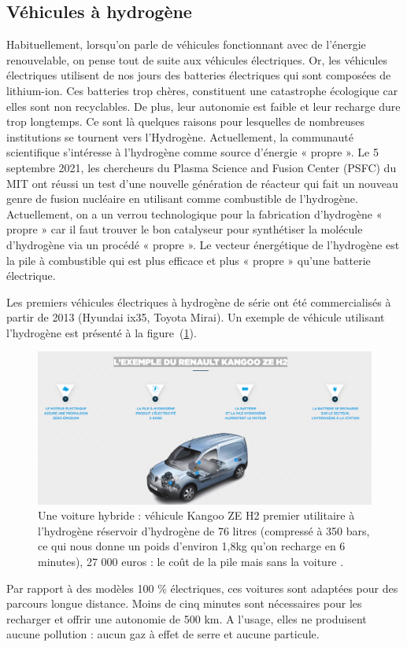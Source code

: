  
 \subsection{Véhicules à hydrogène}
 
 Habituellement, lorsqu'on parle de véhicules fonctionnant avec de l'énergie renouvelable, on pense tout de suite aux véhicules électriques.
 Or, les véhicules électriques utilisent de nos jours des batteries électriques qui sont composées de lithium-ion. Ces batteries trop chères, constituent une catastrophe écologique car elles sont non recyclables. De plus, leur autonomie est faible et leur recharge dure trop longtemps. Ce sont là quelques raisons pour lesquelles de nombreuses institutions se tournent vers l'Hydrogène.
  Actuellement, la communauté scientifique s'intéresse à l'hydrogène comme source d'énergie « propre ». Le 5 septembre 2021, les chercheurs du Plasma Science and Fusion Center (PSFC) du MIT ont réussi un test d'une nouvelle génération de réacteur qui fait un nouveau genre de fusion nucléaire en utilisant comme combustible de l'hydrogène. Actuellement, on a un verrou technologique pour la fabrication d'hydrogène « propre » car il faut trouver le bon catalyseur pour synthétiser la molécule d'hydrogène via un procédé « propre ». Le vecteur énergétique de l'hydrogène est la pile à combustible qui est plus efficace et plus « propre » qu'une batterie électrique. 
 

 Les premiers véhicules électriques à hydrogène de série ont été commercialisés à partir de 2013 (Hyundai ix35, Toyota Mirai). Un exemple de véhicule utilisant l'hydrogène est présenté à la figure~(\ref{vehi}).
 \begin{figure}[H]
 	\centerline{
 		\includegraphics[width=15cm]{images_these/bat.png}}
 	\caption[Une voiture hybride]{Une voiture hybride : véhicule %
 		Kangoo ZE H2 premier utilitaire à l'hydrogène
 		réservoir d'hydrogène de 76 litres (compressé à 350 bars, ce qui nous donne un poids d'environ 1,8kg qu'on recharge en 6 minutes), 27 000 euros : le coût de la pile mais sans la voiture . }%
 	\label{vehi}
 \end{figure}
  Par rapport à des modèles 100 \% électriques, ces voitures sont adaptées pour des parcours longue distance. Moins de cinq minutes sont nécessaires pour les recharger et offrir une autonomie de 500 km. A l'usage, elles ne produisent aucune pollution : aucun gaz à effet de serre et aucune particule.
  

